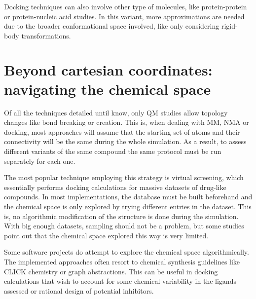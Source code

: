 Docking techniques can also involve other type of molecules, like protein-protein or protein-nucleic acid studies. In this variant, more approximations are needed due to the broader conformational space involved, like only considering rigid-body transformations.

\section{Beyond cartesian coordinates: navigating the chemical space}

Of all the techniques detailed until know, only QM studies allow topology changes like bond breaking or creation. This is, when dealing with MM, NMA or docking, most approaches will assume that the starting set of atoms and their connectivity will be the same during the whole simulation. As a result, to assess different variants of the same compound the same protocol must be run separately for each one.

The most popular technique employing this strategy is virtual screening, which essentially performs docking calculations for massive datasets of drug-like compounds. In most implementations, the database must be built beforehand and the chemical space is only explored by trying different entries in the dataset. This is, no algorithmic modification of the structure is done during the simulation. With big enough datasets, sampling should not be a problem, but some studies point out that the chemical space explored this way is very limited.\cite{virshup2013stochastic}

Some software projects do attempt to explore the chemical space algorithmically.\cite{oprea2001chemography,bon2010bioactivity,larsson2007chemgps,Goodnow_2016,Reymond_2015,Chari_2015,Maggiora_2014,Naveja_2017} The implemented approaches often resort to chemical synthesis guidelines like CLICK chemistry\cite{durrant2009} or graph abstractions.\cite{andersen2014} This can be useful in docking calculations that wish to account for some chemical variability in the ligands assessed or rational design of potential inhibitors.

